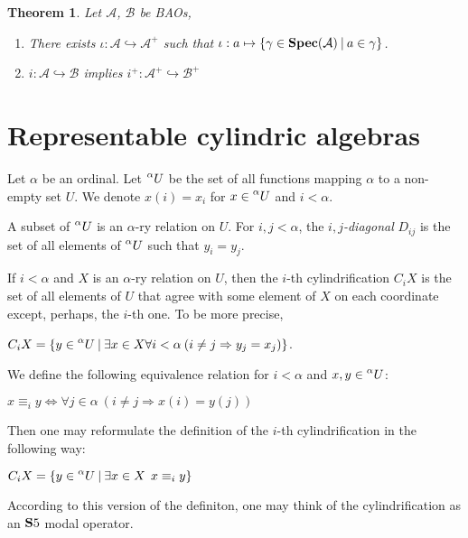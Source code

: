 \documentclass[a4paper]{article}
\theoremstyle{defin}
\theoremstyle{theorem}
\newtheorem{theorem}{Theorem}
\theoremstyle{prop}
\theoremstyle{lemma}
\theoremstyle{fact}
\theoremstyle{ex}
\theoremstyle{col}
\begin{document}
\begin{theorem} Let $\mathcal{A}$, $\mathcal{B}$ be BAOs,

\begin{enumerate}
  \item There exists $\iota : \mathcal{A} \hookrightarrow \mathcal{A}^{+}$ such that
  $\iota : a \mapsto \{ \gamma \in {\bf Spec}(\mathcal{A}) \: | \: a \in \gamma \}$.
  \item $i : \mathcal{A} \hookrightarrow \mathcal{B}$ implies
  $i^{+} : \mathcal{A}^{+} \hookrightarrow \mathcal{B}^{+}$
\end{enumerate}
\end{theorem}

\section{Representable cylindric algebras}

Let $\alpha$ be an ordinal. Let $\prescript{\alpha}{}U$ be the set of all functions mapping $\alpha$ to a non-empty set $U$. We denote $x(i) = x_i$ for
$x \in \prescript{\alpha}{}U$ and $i < \alpha$.

A subset of $\prescript{\alpha}{}U$ is an $\alpha$-ry relation on $U$. For $i, j < \alpha$, the \emph{$i,j$-diagonal} $D_{ij}$ is the set of all elements of $\prescript{\alpha}{}U$ such that $y_i = y_j$.

If $i < \alpha$ and $X$ is an $\alpha$-ry relation on $U$, then
the $i$-th cylindrification $C_i X$ is the set of all elements of $U$ that agree with some element of $X$ on each coordinate except, perhaps, the $i$-th one. To be more precise,
\begin{center}
$C_i X = \{ y \in \prescript{\alpha}{}U \: |
\: \exists x \in X \forall i < \alpha \: (i \neq j \Rightarrow y_j = x_j)\}$.
\end{center}
We define the following equivalence relation for $i < \alpha$ and $x, y \in \prescript{\alpha}{}U$:
\begin{center}
 $x \equiv_i y \Leftrightarrow \forall j \in \alpha \: (i \neq j \Rightarrow x(i) = y(j))$
\end{center}
Then one may reformulate the definition of the $i$-th cylindrification in the following way:

\begin{center}
 $C_i X = \{ y \in \prescript{\alpha}{}U \: | \: \exists x \in X \:\: x \equiv_i y \}$
\end{center}

According to this version of the definiton, one may think of the cylindrification as an ${\bf S}5$ modal operator.
\end{document}
